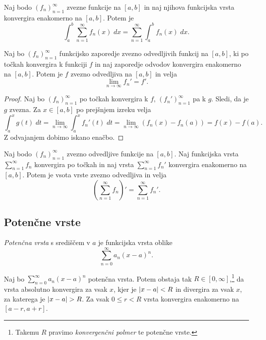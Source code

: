 \documentclass[12pt, a4paper]{article}
\begin{document}
\begin{posledica}
Naj bodo $(f_n)_{n=1}^\infty$ zvezne funkcije na $[a,b]$ in naj njihova funkcijska vrsta konvergira enakomerno na $[a,b]$. Potem je
\[
\int_a^b\sum_{n=1}^\infty f_n(x)\;dx=\sum_{n=1}^\infty\int_a^b f_n(x)\;dx.
\]
\end{posledica}

\begin{izrek}
Naj bo $(f_n)_{n=1}^\infty$ funkcijsko zaporedje zvezno odvedljivih funkcij na $[a,b]$, ki po točkah konvergira k funkciji $f$ in naj zaporedje odvodov konvergira enakomerno na $[a,b]$. Potem je $f$ zvezno odvedljiva na $[a,b]$ in velja
\[
\lim_{n\to\infty} f_n'=f'.
\]
\end{izrek}

\begin{proof}
Naj bo $(f_n)_{n=1}^\infty$ po točkah konvergira k $f$, $(f_n')_{n=1}^\infty$ pa k $g$. Sledi, da je $g$ zvezna. Za $x\in[a,b]$ po prejšnjem izreku velja
\[
\int_a^x g(t)\;dt=\lim_{n\to\infty}\int_a^xf_n'(t)\;dt=\lim_{n\to\infty}\left(f_n(x)-f_n(a)\right)=f(x)-f(a).
\]
Z odvajanjem dobimo iskano enačbo.
\end{proof}

\begin{posledica}
Naj bodo $(f_n)_{n=1}^\infty$ zvezno odvedljive funkcije na $[a,b]$. Naj funkcijska vrsta $\displaystyle\sum_{n=1}^\infty f_n$ konvergira po točkah in naj vrsta $\displaystyle\sum_{n=1}^\infty f_n'$ konvergira enakomerno na $[a,b]$. Potem je vsota vrste zvezno odvedljiva in velja
\[
\left(\sum_{n=1}^\infty f_n\right)'=\sum_{n=1}^\infty f_n'.
\]
\end{posledica}

\newpage

\subsection{Potenčne vrste}

\begin{definicija}
\emph{Potenčna vrsta} s središčem v $a$ je funkcijska vrsta oblike
\[
\sum_{n=0}^\infty a_n(x-a)^n.
\]
\end{definicija}

\begin{izrek}
Naj bo $\displaystyle\sum_{n=0}^\infty a_n(x-a)^n$ potenčna vrsta. Potem obstaja tak $R\in[0,\infty]$,\footnote{Takemu $R$ pravimo \emph{konvergenčni polmer} te potenčne vrste.} da vrsta absolutno konvergira za vsak $x$, kjer je $\left\lvert x-a\right\rvert<R$ in divergira za vsak $x$, za katerega je $\left\lvert x-a\right\rvert>R$. Za vsak $0\leq r<R$ vrsta konvergira enakomerno na $[a-r,a+r]$.
\end{izrek}
\end{document}
